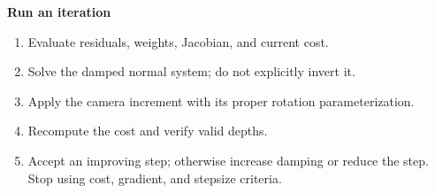 \documentclass[letterpaper,11pt,english,openany,oneside]{jupyterBook}
\begin{document}
\begin{TextbookBox}
\textbf{Run an iteration}\par\smallskip
\begin{enumerate}
%
\item {}
\sphinxAtStartPar
Evaluate residuals, weights, Jacobian, and current cost.

\item {}
\sphinxAtStartPar
Solve the damped normal system; do not explicitly invert it.

\item {}
\sphinxAtStartPar
Apply the camera increment with its proper rotation parameterization.

\item {}
\sphinxAtStartPar
Recompute the  cost and verify valid depths.

\item {}
\sphinxAtStartPar
Accept an improving step; otherwise increase damping or reduce the step. Stop using cost, gradient, and step\sphinxhyphen{}size criteria.

\end{enumerate}

\end{TextbookBox}
\label{\detokenize{lectures/lecture06/optimization:ex-lec06-gn}}
\end{document}

